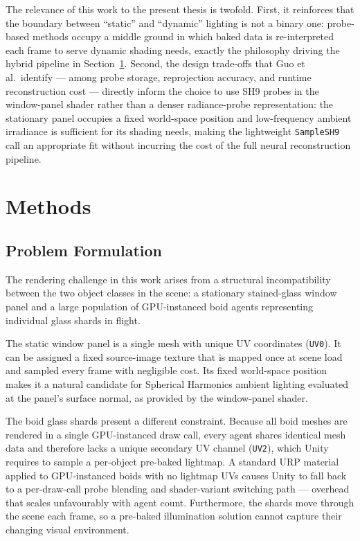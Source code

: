 \documentclass[12pt]{article}
\begin{document}
The relevance of this work to the present thesis is twofold. First, it
reinforces that the boundary between ``static'' and ``dynamic'' lighting
is not a binary one: probe-based methods occupy a middle ground in which
baked data is re-interpreted each frame to serve dynamic shading needs,
exactly the philosophy driving the hybrid pipeline in
Section~\ref{sec:methods}. Second, the design trade-offs that Guo et al.\ identify --- among probe storage, reprojection accuracy, and runtime reconstruction cost --- directly inform the choice to use SH9 probes in the window-panel shader rather than a denser radiance-probe representation: the stationary panel occupies a fixed world-space position and low-frequency ambient irradiance is sufficient for its shading needs, making the lightweight \texttt{SampleSH9} call an appropriate fit without incurring the cost of the full neural reconstruction pipeline.


\clearpage
\section{Methods}
\label{sec:methods}
 
\subsection{Problem Formulation}
\label{subsec:problem-formulation}

The rendering challenge in this work arises from a structural incompatibility between the two object classes in the scene: a stationary stained-glass window panel and a large population of GPU-instanced boid agents representing individual glass shards in flight.

The static window panel is a single mesh with unique UV coordinates (\texttt{UV0}). It can be assigned a fixed source-image texture that is mapped once at scene load and sampled every frame with negligible cost. Its fixed world-space position makes it a natural candidate for Spherical Harmonics ambient lighting evaluated at the panel's surface normal, as provided by the window-panel shader.

The boid glass shards present a different constraint. Because all boid meshes are rendered in a single GPU-instanced draw call, every agent shares identical mesh data and therefore lacks a unique secondary UV channel (\texttt{UV2}), which Unity requires to sample a per-object pre-baked lightmap. A standard URP material applied to GPU-instanced boids with no lightmap UVs causes Unity to fall back to a per-draw-call probe blending and shader-variant switching path --- overhead that scales unfavourably with agent count. Furthermore, the shards move through the scene each frame, so a pre-baked illumination solution cannot capture their changing visual environment.
\end{document}
